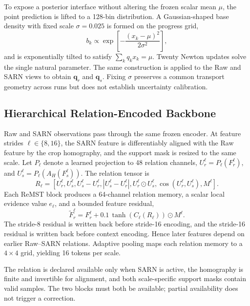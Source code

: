 \documentclass[electronics,article,submit,oneauthor]{Definitions/mdpi}
\begin{document}
To expose a posterior interface without altering the frozen scalar mean $\mu$, the point prediction is lifted to a 128-bin distribution. A Gaussian-shaped base density with fixed scale $\sigma=0.025$ is formed on the progress grid,
\begin{equation}
b_k\propto\exp\left[-\frac{(x_k-\mu)^2}{2\sigma^2}\right],
\end{equation}
and is exponentially tilted to satisfy $\sum_kq_kx_k=\mu$. Twenty Newton updates solve the single natural parameter. The same construction is applied to the Raw and SARN views to obtain $\mathbf{q}_r$ and $\mathbf{q}_s$. Fixing $\sigma$ preserves a common transport geometry across runs but does not establish uncertainty calibration.

\subsection{Hierarchical Relation-Encoded Backbone}
\label{subsec:blocks}

Raw and SARN observations pass through the same frozen encoder. At feature strides $\ell\in\{8,16\}$, the SARN feature is differentiably aligned with the Raw feature by the crop homography, and the support mask is resized to the same scale. Let $P_{\ell}$ denote a learned projection to 48 relation channels, $U_r^{\ell}=P_{\ell}(F_r^{\ell})$, and $U_s^{\ell}=P_{\ell}(A_H(F_s^{\ell}))$. The relation tensor is
\begin{equation}
R_{\ell}=\left[
U_r^{\ell},U_s^{\ell},
U_s^{\ell}-U_r^{\ell},
\left|U_s^{\ell}-U_r^{\ell}\right|,
U_r^{\ell}\odot U_s^{\ell},
\cos(U_r^{\ell},U_s^{\ell}),
M^{\ell}
\right].
\label{eq:relation_tensor}
\end{equation}
Each ReMST block produces a 64-channel relation memory, a scalar local evidence value $e_{\ell}$, and a bounded feature residual,
\begin{equation}
\widetilde{F}_r^{\ell}=F_r^{\ell}
+0.1\,\tanh\!\left(C_{\ell}(R_{\ell})\right)\odot M^{\ell}.
\label{eq:feature_rewrite}
\end{equation}
The stride-8 residual is written back before stride-16 encoding, and the stride-16 residual is written back before context encoding. Hence later features depend on earlier Raw--SARN relations. Adaptive pooling maps each relation memory to a $4\times4$ grid, yielding 16 tokens per scale.

The relation is declared available only when SARN is active, the homography is finite and invertible for alignment, and both scale-specific support masks contain valid samples. The two blocks must both be available; partial availability does not trigger a correction.
\end{document}
